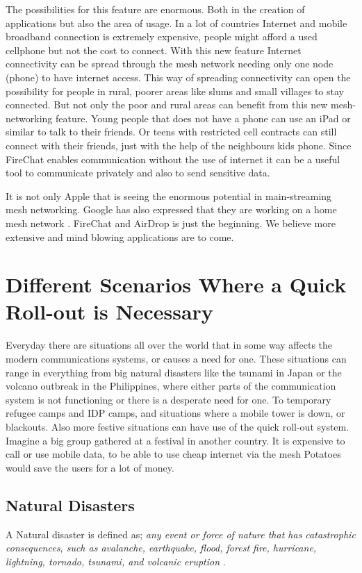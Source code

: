 The possibilities for this feature are enormous. Both in the creation of applications but also the area of usage. In a lot of countries Internet and mobile broadband connection is extremely expensive, people might afford a used cellphone but not the cost to connect. With this new feature Internet connectivity can be spread through the mesh network needing only one node (phone) to have internet access. This way of spreading connectivity can open the possibility for people in rural, poorer areas like slums and small villages to stay connected. But not only the poor and rural areas can benefit from this new mesh-networking feature. Young people that does not have a phone can use an iPad or similar to talk to their friends. Or teens with restricted cell contracts can still connect with their friends, just with the help of the neighbours kids phone. Since FireChat enables communication without the use of internet it can be a useful tool to communicate privately and also to send sensitive data.
 
It is not only Apple that is seeing the enormous potential in main-streaming mesh networking. Google has also expressed that they are working on a home mesh network \cite{googleMesh}. FireChat and AirDrop is just the beginning. We believe more extensive and mind blowing applications are to come. 
 
\section{Different Scenarios Where a Quick Roll-out is Necessary}

Everyday there are situations all over the world that in some way affects the modern communications systems, or causes a need for one. These situations can range in everything from big natural disasters like the tsunami in Japan or the volcano outbreak in the Philippines, where either parts of the communication system is not functioning or there is a desperate need for one. To temporary refugee camps and IDP camps, and situations where a mobile tower is down, or blackouts. Also more festive situations can have use of the quick roll-out system. Imagine a big group gathered at a festival in another country. It is expensive to call or use mobile data, to be able to use cheap internet via the mesh Potatoes would save the users for a lot of money. 

\subsection{Natural Disasters}
A Natural disaster is defined as; \textit{any event or force of nature that has catastrophic consequences, such as avalanche, earthquake, flood, forest fire, hurricane, lightning, tornado, tsunami, and volcanic eruption} \cite{naturalDisaster}.


